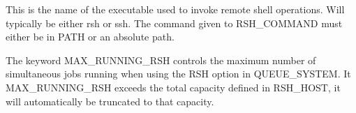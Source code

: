\documentclass[letterpaper,10pt,english]{sphinxmanual}
\begin{document}
\begin{sphinxShadowBox}

This is the name of the executable used to invoke remote shell operations.
Will typically be either rsh or ssh. The command given to RSH\_COMMAND must
either be in PATH or an absolute path.

%
\begin{sphinxVerbatim}[commandchars=\\\{\}]
\end{sphinxVerbatim}

The keyword MAX\_RUNNING\_RSH controls the maximum number of simultaneous jobs
running when using the RSH option in QUEUE\_SYSTEM. It MAX\_RUNNING\_RSH exceeds
the total capacity defined in RSH\_HOST, it will automatically be truncated to
that capacity.


%
\begin{sphinxVerbatim}[commandchars=\\\{\}]
      
   
 
\end{sphinxVerbatim}
\end{sphinxShadowBox}
\end{document}
